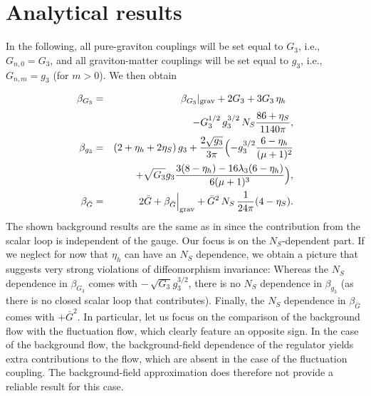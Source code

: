 \documentclass[11pt]{book} %
\newcommand{\bea}{\begin{eqnarray}}
\newcommand{\eea}{\end{eqnarray}}
\begin{document}
\section{Analytical results}
In the following, all pure-graviton couplings will be set equal to $G_3$, i.e., $G_{n,0}= G_3$, and 
all graviton-matter couplings will be set equal to $g_3$, i.e., $G_{n,m}=g_3$ (for $m>0$). 
We then obtain
%
\bea
\beta_{G_3}&=& \beta_{G_3}|_{\rm grav} + 2 G_3 + 3G_3\, \eta_h \phantom{\frac{1}{1}}\nonumber\\
&{}& - G_3^{1/2} \,g_3^{3/2}\, N_S\frac{86+\eta_S}{1140 \pi}, \label{eq:betaG3}\\
%
\beta_{g_3}&=& \left(2 +\eta_h+ 2\eta_S\right)g_3  +  \frac{2\sqrt{g_3}}{3\pi} \Bigl(-g_3^{3/2} \frac{6-\eta_h}{(\mu+1)^2} \nonumber\\
&{}&+ \sqrt{G_3}g_3 \frac{3(8-\eta_h)-16\lambda_3(6-\eta_h)}{6(\mu+1)^3} \Bigr)\label{eq:betag3},\\
%
\beta_{\bar{G}}&=& 2 \bar{G}+ \beta_{\bar{G}}\Big|_{\rm grav} %
+ \bar{G}^2\, N_S\, \frac{1}{24\pi}(4-\eta_S).
\eea
%
The shown background results are the same as in \cite{Dona:2013qba} since the contribution from the scalar loop is independent of the gauge.
Our focus is on the $N_S$-dependent part. 
If we neglect for now that $\eta_h$ can have an $N_S$ dependence, we obtain a picture that suggests very strong violations of diffeomorphism invariance: 
Whereas the $N_S$ dependence in $\beta_{G_3}$ comes with $-\,\sqrt{G_3}g_3^{3/2}$, there is no $N_S$ dependence in $\beta_{g_3}$ (as there is no closed scalar loop that contributes). 
Finally, the $N_S$ dependence in $\beta_{\bar{G}}$ comes with $+ \bar{G}^2$. 
In particular, let us focus on the comparison of the background flow with the fluctuation flow, which clearly feature an opposite sign. 
In the case of the background flow, the background-field dependence of the regulator yields extra contributions to the flow, which are absent in the case of the fluctuation coupling. 
The background-field approximation does therefore not provide a reliable result for this case.
\end{document}

